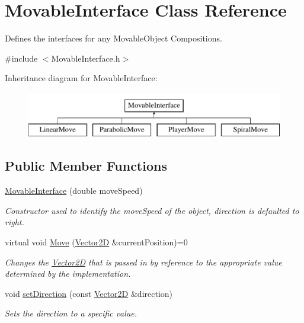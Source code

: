 \hypertarget{class_movable_interface}{}\section{Movable\+Interface Class Reference}
\label{class_movable_interface}


Defines the interfaces for any Movable\+Object Compositions.  




{\ttfamily \#include $<$Movable\+Interface.\+h$>$}

Inheritance diagram for Movable\+Interface\+:\begin{figure}[H]
\begin{center}
\leavevmode
\includegraphics[height=2.000000cm]{dd/d92/class_movable_interface}
\end{center}
\end{figure}
\subsection*{Public Member Functions}
\begin{DoxyCompactItemize}
\item 
\hyperlink{class_movable_interface_a480a181d92f826515483b8ba57e4f030}{Movable\+Interface} (double move\+Speed)
\begin{DoxyCompactList}\small\item\em Constructor used to identify the move\+Speed of the object, direction is defaulted to right. \end{DoxyCompactList}\item 
virtual void \hyperlink{class_movable_interface_a899cc1c78eacbee13b906c6770e7f025}{Move} (\hyperlink{class_vector2_d}{Vector2D} \&current\+Position)=0
\begin{DoxyCompactList}\small\item\em Changes the \hyperlink{class_vector2_d}{Vector2D} that is passed in by reference to the appropriate value determined by the implementation. \end{DoxyCompactList}\item 
void \hyperlink{class_movable_interface_ac03895780649f51c762907e8ef3a7694}{set\+Direction} (const \hyperlink{class_vector2_d}{Vector2D} \&direction)
\begin{DoxyCompactList}\small\item\em Sets the direction to a specific value. \end{DoxyCompactList}\end{DoxyCompactItemize}

